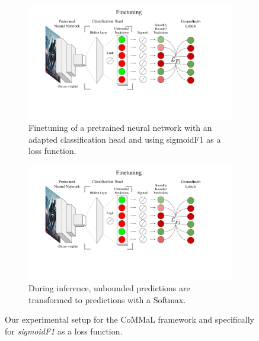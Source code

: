 \begin{figure}[!tp]
\centering
     \begin{subfigure}{0.6\linewidth}
         \centering
         \includegraphics[page=1,width=\linewidth,trim=80 100 110 0,clip]{images/SIGIR2021 Loss Diagram.pdf}
         \caption{Finetuning of a pretrained neural network with an adapted classification head and using sigmoidF1 as a loss function.}
     \end{subfigure}
     \hspace{.02\linewidth}
     \begin{subfigure}{0.36\linewidth}
         \centering
         \includegraphics[page=2,width=\linewidth,trim=190 100 210 0,clip]{images/SIGIR2021 Loss Diagram.pdf}
         \caption{During inference, unbounded predictions are transformed to predictions with a Softmax.}
     \end{subfigure}
     \vspace{.5\baselineskip}
\caption{Our experimental setup for the CoMMaL framework and specifically for \emph{sigmoidF1} as a loss function.}
\label{fig:architecture}
\end{figure}

